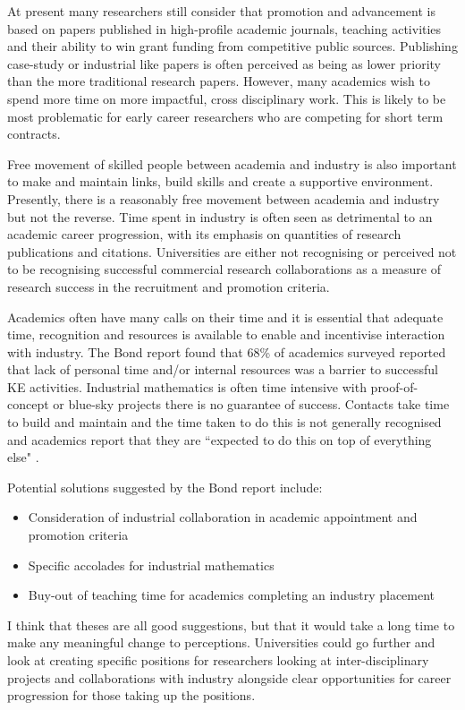 \documentclass[11pt]{article} %
\begin{document}
	At present many researchers still consider that promotion and advancement is based on papers published in high-profile academic journals, teaching activities and their ability to win grant funding from competitive public sources. Publishing case-study or industrial like papers is often perceived as being as lower priority than the more traditional research papers. However, many academics wish to spend more time on more impactful, cross disciplinary work. This is likely to be most problematic for early career researchers who are competing for short term contracts. 
	
	Free movement of skilled people between academia and industry is also important to make and maintain links, build skills and create a supportive environment. Presently, there is a reasonably free movement between academia and industry but not the reverse. Time spent in industry is often seen as detrimental to an academic career progression, with its  emphasis on  quantities of research publications and citations.  Universities are either not recognising or perceived not to be recognising successful commercial research collaborations as a measure of research success in the recruitment and promotion criteria. 
	
	Academics often have many calls on their time and it is essential that adequate time, recognition and resources is available to enable and incentivise interaction with industry. The Bond report \cite{Bond} found that  68\% of academics surveyed reported that lack of personal time and/or internal resources was a barrier to successful KE activities.  
	Industrial mathematics is often time intensive with proof-of-concept or blue-sky projects there is no guarantee of success. Contacts take time to build and maintain and the time taken to do this is not generally recognised and academics report that they are ``expected to do this on top of everything else" \cite{Bond}.
	
	Potential solutions suggested by the Bond report include: 
	\begin{itemize}
		\item Consideration of industrial collaboration in academic appointment and promotion criteria
		\item Specific accolades for industrial mathematics
		\item Buy-out of teaching time for academics completing an industry placement
	\end{itemize} 

I think that theses are all good suggestions, but that it would take a long time to make any meaningful change to perceptions. Universities could go further and look at creating specific positions  for researchers looking at inter-disciplinary projects and collaborations with industry alongside clear opportunities for career progression for those taking up the positions. 
\end{document}
